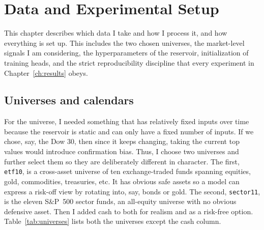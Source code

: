 
\chapter{Data and Experimental Setup}
\label{ch:setup}
This chapter describes which data I take and how I process it, and how everything is set up. This includes the two chosen universes, the market-level signals I am considering, the hyperparameters of the reservoir, initialization of training heads, and the strict reproducibility discipline that every experiment in Chapter~\ref{ch:results} obeys. 

\section{Universes and calendars}
\label{sec:universes}

For the universe, I needed something that has relatively fixed inputs over time because the reservoir is static and can only have a fixed number of inputs. If we chose, say, the Dow 30, then since it keeps changing, taking the current top values would introduce confirmation bias. Thus, I choose two universes and further select them so they are deliberately different in character. The first, \texttt{etf10}, is a cross-asset universe of ten exchange-traded funds spanning equities, gold, commodities, treasuries, etc. It has obvious safe assets so a model can express a risk-off view by rotating into, say, bonds or gold. The second, \texttt{sector11}, is the eleven S\&P~500 sector funds, an all-equity universe with no obvious defensive asset. Then I added cash to both for realism and as a risk-free option. Table~\ref{tab:universes} lists both the universes except the cash column.


